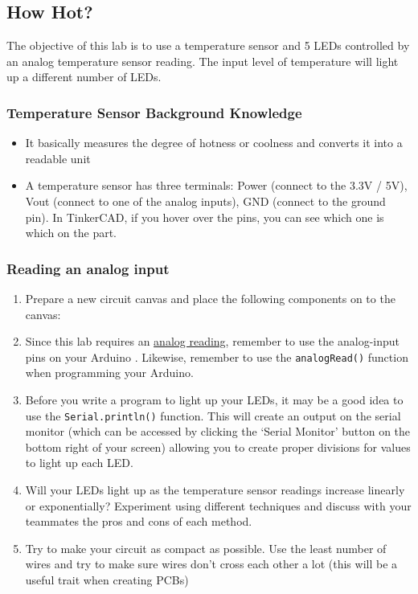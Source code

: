 \documentclass{article}
\begin{document}
\subsection{How Hot?}
The objective of this lab is to use a temperature sensor and 5 LEDs controlled by an analog temperature sensor reading. The input level of temperature will light up a different number of LEDs.
\subsubsection{Temperature Sensor Background Knowledge}
\begin{itemize}
    \item It basically measures the degree of hotness or coolness and converts it into a readable unit
    \item A temperature sensor has three terminals: Power (connect to the 3.3V / 5V), Vout (connect to one of the analog inputs), GND (connect to the ground pin). In TinkerCAD, if you hover over the pins, you can see which one is which on the part. 
\end{itemize}
\subsubsection{Reading an analog input}
\begin{enumerate}
  \item Prepare a new circuit canvas and place the following components on to the canvas:
  \item Since this lab requires an \href{https://learn.sparkfun.com/tutorials/analog-vs-digital/}{analog reading}, remember to use the analog-input pins on your Arduino . Likewise, remember to use the \texttt{analogRead()} function when programming your Arduino.
  \item Before you write a program to light up your LEDs, it may be a good idea to use the \texttt{Serial.println()} function. This will create an output on the serial monitor (which can be accessed by clicking the ‘Serial Monitor’ button on the bottom right of your screen) allowing you to create proper divisions for values to light up each LED.
  \item Will your LEDs light up as the temperature sensor readings increase linearly or exponentially? Experiment using different techniques and discuss with your teammates the pros and cons of each method.
  \item Try to make your circuit as compact as possible. Use the least number of wires and try to make sure wires don’t cross each other a lot (this will be a useful trait when creating PCBs)
\end{enumerate}
\end{document}
